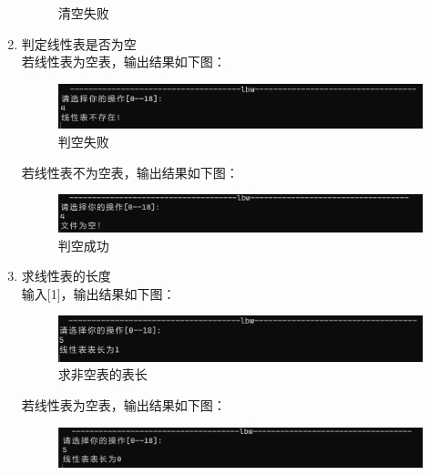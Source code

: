 \documentclass[supercite]{Experimental_Report}
\theoremstyle{definition}
\begin{document}
\begin{enumerate}
\begin{figure}[htbp]
				\caption{清空失败}
				\label{fig1-13}
			\end{figure}
		\item 判定线性表是否为空\\
		若线性表为空表，输出结果如下图：
		\begin{figure}[htbp]
			\centering
			\begin{minipage}{0.7\linewidth}
				\centering
				\includegraphics[width=0.9\linewidth]{images/判空失败.png}
			\end{minipage}
			\caption{判空失败}
			\label{fig1-14}
		\end{figure}
		若线性表不为空表，输出结果如下图：
	\begin{figure}[htbp]
		\centering
		\begin{minipage}{0.7\linewidth}
			\centering
			\includegraphics[width=0.9\linewidth]{images/判空成功.png}
		\end{minipage}
		\caption{判空成功}
		\label{fig1-15}
	\end{figure}
		\item 求线性表的长度\\
		输入[1]，输出结果如下图：
		\begin{figure}[htbp]
			\centering
			\begin{minipage}{0.7\linewidth}
				\centering
				\includegraphics[width=0.9\linewidth]{images/求长度1.png}
			\end{minipage}
			\caption{求非空表的表长}
			\label{fig1-16}
		\end{figure}
	若线性表为空表，输出结果如下图：
	\begin{figure}[htbp]
		\centering
		\begin{minipage}{0.7\linewidth}
			\centering
			\includegraphics[width=0.9\linewidth]{images/求长度0.png}

\end{minipage}
\end{figure}
\end{enumerate}
\end{document}
